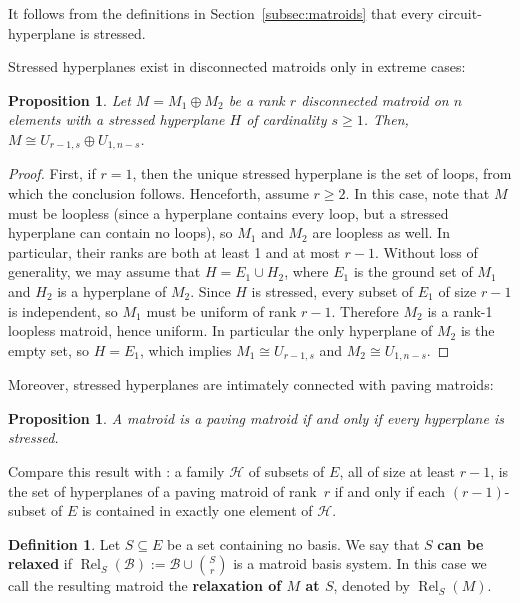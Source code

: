 \documentclass[11pt]{amsart}
\newtheorem{proposition}[theorem]{Proposition}
\theoremstyle{definition}
\newtheorem{definition}[theorem]{Definition}
\newcommand{\0}{\emptyset}
\newcommand{\B}{\mathcal{B}}
\DeclareMathOperator{\Rel}{Rel} %
\newcommand{\defterm}[1]{\textbf{#1}}
\newcommand{\HH}{\mathcal{H}}
\begin{document}
It follows from the definitions in Section~\ref{subsec:matroids} that every circuit-hyperplane is stressed.

Stressed hyperplanes exist in disconnected matroids only in extreme cases:

\begin{proposition}\label{prop:disconnected_stressed}
Let $ M=M_1\oplus M_2 $ be a rank $ r $ disconnected matroid on $ n $ elements with a stressed hyperplane $ H $ of cardinality $ s \geq 1$.
Then, $ M \cong U_{r-1, s}\oplus U_{1, n-s} $.
\end{proposition}
\begin{proof}
First, if $r=1$, then the unique stressed hyperplane is the set of loops, from which the conclusion follows.  
Henceforth, assume $r\geq2$.  
In this case, note that $ M $ must be loopless (since a hyperplane contains every loop, but a stressed hyperplane can contain no loops), so $M_1$ and $M_2$ are loopless as well.  
In particular, their ranks are both at least 1 and at most $ r-1 $.
Without loss of generality, we may assume that $H = E_1 \cup H_2$, where $ E_1 $ is the ground set of $ M_1 $ and $ H_2 $ is a hyperplane of $ M_2 $.
Since $ H $ is stressed, every subset of $E_1$ of size $r-1$ is independent, so $ M_1 $ must be uniform of rank $ r-1 $.
Therefore $ M_2 $ is a rank-1 loopless matroid, hence uniform.  
In particular the only hyperplane of $ M_2 $ is the empty set, so $ H = E_1 $, which implies $ M_1 \cong U_{r-1, s} $ and $ M_2 \cong U_{1, n-s} $.
\end{proof}

Moreover, stressed hyperplanes are intimately connected with paving matroids:

\begin{proposition}{\cite[Prop.~3.16]{relaxation}}\label{prop:stressed_hyps_paving}
A matroid is a paving matroid if and only if every hyperplane is stressed.
\end{proposition}

Compare this result with \cite[Prop.~2.1.21]{Oxley}: a family $\HH$ of subsets of $E$, all of size at least $r-1$, is the set of hyperplanes of a paving matroid of rank~$r$ if and only if each $(r-1)$-subset of $E$ is contained in exactly one element of $\HH$.


\begin{definition}\label{def:gen_relaxed}
Let $S\subseteq E$ be a set containing no basis.  
We say that $S$ \defterm{can be relaxed} if $\Rel_S(\B):=\B\cup\binom{S}{r}$ is a matroid basis system.
In this case we call the resulting matroid the \textbf{relaxation of $M$ at $S$}, denoted by $\Rel_S(M)$.
\end{definition}
\end{document}
